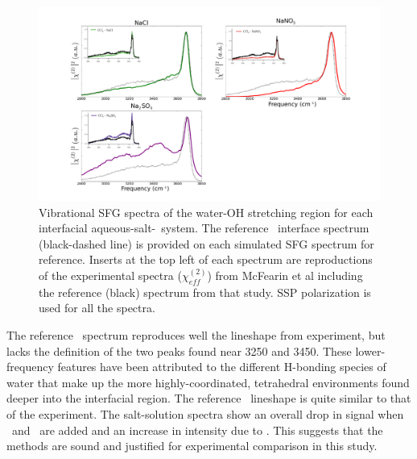 \begin{figure}[h!]
\begin{center}
	\includegraphics[scale=1.0]{images/sfg-spectra.png}
	\caption{Vibrational SFG spectra of the water-OH stretching region for each interfacial aqueous-salt-\ctc~system. The reference \ctcwat~interface spectrum (black-dashed line) is provided on each simulated SFG spectrum for reference. Inserts at the top left of each spectrum are reproductions of the experimental spectra ($\chi^{(2)}_{eff}$) from McFearin et al\cite{McFearin2009} including the reference (black) spectrum from that study. SSP polarization is used for all the spectra.}
	\label{fig:sfg-spectra}
\end{center}
\end{figure}


The reference \ctcwat~spectrum reproduces well the lineshape from experiment, but lacks the definition of the two peaks found near 3250 and 3450\cm. These lower-frequency features have been attributed to the different H-bonding species of water that make up the more highly-coordinated, tetrahedral environments found deeper into the interfacial region. The reference \ctcwat~lineshape is quite similar to that of the experiment. The salt-solution spectra show an overall drop in signal when \cl~and \nit~are added and an increase in intensity due to \sul. This suggests that the methods are sound and justified for experimental comparison in this study.

